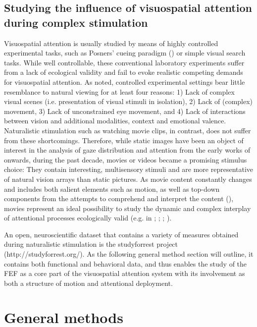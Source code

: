 \documentclass[a4paper, 12pt]{scrreprt}
\begin{document}
\subsection{Studying the influence of visuospatial attention during complex stimulation }
Visuospatial attention is usually studied by means of highly controlled experimental tasks, such as Posners' cueing paradigm (\cite{posner1980attention}) or simple visual search tasks. While well controllable, these conventional laboratory experiments suffer from a lack of ecological validity and fail to evoke realistic competing demands for visuospatial attention. As \textcite{hasson2004intersubject} noted, controlled experimental settings bear little resemblance to natural viewing for at least four reasons: 1) Lack of complex visual scenes (i.e. presentation of visual stimuli in isolation), 2) Lack of (complex) movement, 3) Lack of unconstrained eye movement, and 4) Lack of interactions between vision and additional modalities, context and emotional valence. Naturalistic stimulation such as watching movie clips, in contrast, does not suffer from these shortcomings. Therefore, while static images have been an object of interest in the analysis of gaze distribution and attention from the early works of \textcite{yarbus1967eye} onwards, during the past decade, movies or videos became a promising stimulus choice: They contain interesting, multisensory stimuli and are more representative of natural vision arrays than static pictures. As movie content constantly changes and includes both salient elements such as motion, as well as top-down components from the attempts to comprehend and interpret the content (\cite{ross2013eye}), movies represent an ideal possibility to study the dynamic and complex interplay of attentional processes ecologically valid (e.g. in \textcite{hasson2004intersubject}; \cite{carmi2006visual}; \cite{tseng2009quantifying}; \cite{dorr2010variability}).

An open, neuroscientific dataset that contains a variety of measures obtained during naturalistic stimulation is the studyforrest project (http://studyforrest.org/). As the following general method section will outline, it contains both functional and behavioral data, and thus enables the study of the FEF as a core part of the visuospatial attention system with its involvement as both a structure of motion and attentional deployment.



\section{General methods}\label{section:generalmethods}
\end{document}
